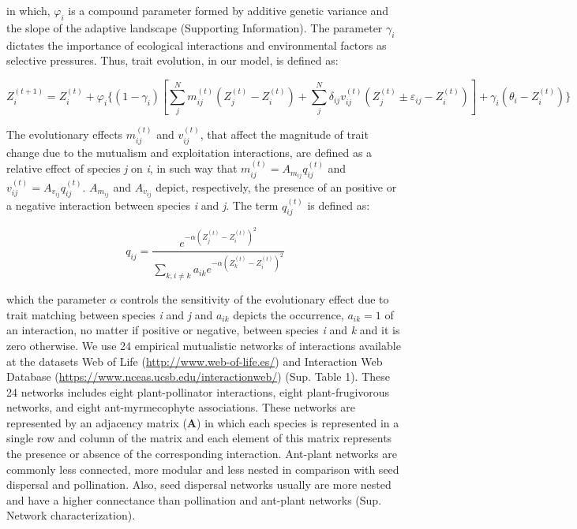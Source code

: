 \documentclass[a4paper, 12pt]{article}
\begin{document}
in which, $\varphi_{i}$ is a compound parameter formed by additive genetic variance and the slope of the adaptive landscape (Supporting Information). The parameter $\gamma_{i}$ dictates the importance of ecological interactions and environmental factors as selective pressures. Thus, trait evolution, in our model, is defined as:

\begin{equation} \label{eq:5}
  Z^{(t+1)}_{i} = Z^{(t)}_{i} + \varphi_{i}\{(1 - \gamma_{i})[\sum^{N}_{j} m^{(t)}_{ij}(Z^{(t)}_{j} - Z^{(t)}_{i}) + \sum^{N}_{j}\delta_{ij}v^{(t)}_{ij}(Z^{(t)}_{j} \pm \varepsilon_{ij} - Z^{(t)}_{i})] + \gamma_{i}(\theta_{i} - Z^{(t)}_{i})\}
\end{equation}

The evolutionary effects $m^{(t)}_{ij}$ and $v^{(t)}_{ij}$, that affect the magnitude of trait change due to the mutualism and exploitation interactions, are defined as a relative effect of species \textit{j} on \textit{i}, in such way that $m^{(t)}_{ij} = A_{m_{ij}}q^{(t)}_{ij}$  and $v^{(t)}_{ij} = A_{v_{ij}}q^{(t)}_{ij}$.  $A_{m_{ij}}$ and $A_{v_{ij}}$ depict, respectively, the presence of an positive or a negative interaction between species \textit{i} and \textit{j}. The term $q^{(t)}_{ij}$ is defined as:

\begin{equation} \label{eq:6}
  q_{ij} = \frac{e^{-\alpha(Z^{(t)}_{j} - Z^{(t)}_{i})^2}}{\sum_{k, i \neq k} a_{ik} e^{-\alpha(Z^{(t)}_{k} - Z^{(t)}_{i})^2} }
\end{equation}

which the parameter $\alpha$ controls the sensitivity of the evolutionary effect due to trait matching between species \textit{i} and \textit{j} and $a_{ik}$ depicts the occurrence, $a_{ik} = 1$ of an interaction, no matter if positive or negative, between species \textit{i} and \textit{k} and it is zero otherwise. We use 24 empirical mutualistic networks of interactions available at the datasets Web of Life (\url{http://www.web-of-life.es/}) and Interaction Web Database (\url{https://www.nceas.ucsb.edu/interactionweb/}) (Sup. Table 1). These 24 networks includes eight plant-pollinator interactions, eight plant-frugivorous networks, and eight ant-myrmecophyte associations. These networks are represented by an adjacency matrix (\textbf{A}) in which each species is represented in a single row and column of the matrix and each element of this matrix represents the presence or absence of the corresponding interaction. Ant-plant networks are commonly less connected, more modular and less nested in comparison with seed dispersal and pollination. Also, seed dispersal networks usually are more nested and have a higher connectance than pollination and ant-plant networks (Sup. Network characterization).
\end{document}
